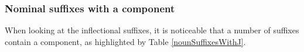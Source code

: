 

\subsubsection{Nominal suffixes with a  component}\label{JcomponentNounSuffixes}
When looking at the inflectional suffixes, it is noticeable that a number of suffixes contain a  component, as highlighted by Table \vref{nounSuffixesWithJ}. 

